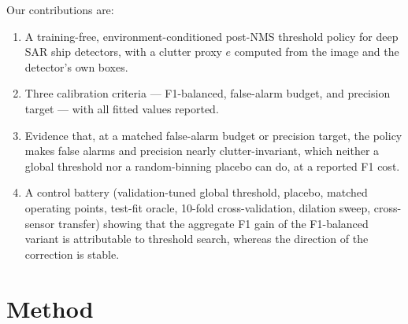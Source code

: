 \documentclass[journal]{IEEEtran}
\providecommand{\linelabel}[1]{}
\begin{document}
\linelabel{ln:contrib}Our contributions are:
\begin{enumerate}[label=(\arabic*), leftmargin=*, noitemsep, topsep=2pt]
  \item A training-free, environment-conditioned post-NMS threshold policy
        for deep SAR ship detectors, with a clutter proxy $e$ computed from
        the image and the detector's own boxes.
  \item Three calibration criteria --- F1-balanced, false-alarm budget,
        and precision target --- with all fitted values reported.
  \item Evidence that, at a matched false-alarm budget or precision
        target, the policy makes false alarms and precision nearly
        clutter-invariant, which neither a global threshold nor a
        random-binning placebo can do, at a reported F1 cost.
  \item A control battery (validation-tuned global threshold, placebo,
        matched operating points, test-fit oracle, 10-fold
        cross-validation, dilation sweep, cross-sensor transfer) showing
        that the aggregate F1 gain of the F1-balanced variant is
        attributable to threshold search, whereas the direction of the
        correction is stable.
\end{enumerate}

\section{Method}
\label{sec:method}
\end{document}
